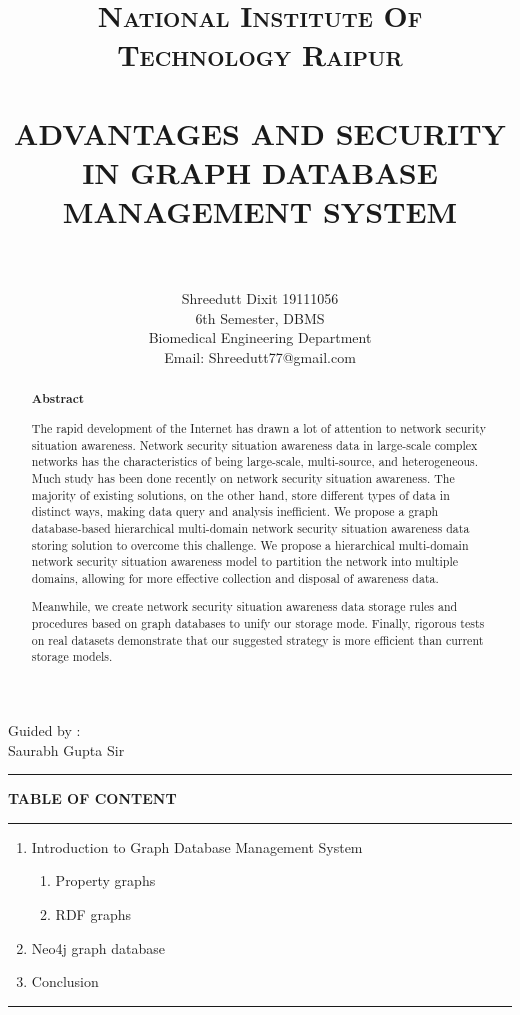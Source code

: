 \documentclass[paper=a4, fontsize=11pt]{scrartcl}
\title{
		\usefont{OT1}{bch}{b}{n}
		\normalfont \normalsize \textsc{National Institute Of Technology Raipur} \\ [25pt]
		\horrule{0.5pt} \\[0.4cm]
		\huge ADVANTAGES AND SECURITY IN GRAPH DATABASE MANAGEMENT SYSTEM  \\
		\horrule{2pt} \\[0.5cm]
}
\author{
        Shreedutt Dixit 19111056\\6th Semester, 
        DBMS\\ Biomedical Engineering Department\\	
        Email: Shreedutt77@gmail.com
        \normalsize
}
\date{}
\numberwithin{equation}{section}		%
\numberwithin{figure}{section}			%
\numberwithin{table}{section}				%
\begin{document}
\maketitle
\begin{flushright}
    Guided by :\\
    Saurabh Gupta Sir
\end{flushright}

\noindent\rule{\textwidth}{1pt}
\begin{abstract}
    \begin{center}
        \Large{\textbf{Abstract}}\\
    \end{center}
    \Large { The rapid development of the Internet has drawn a lot of attention to network security situation awareness. Network security situation awareness data in large-scale complex networks has the characteristics of being large-scale, multi-source, and heterogeneous. Much study has been done recently on network security situation awareness. The majority of existing solutions, on the other hand, store different types of data in distinct ways, making data query and analysis inefficient.
    \newpage 
    We propose a graph database-based hierarchical multi-domain network security situation awareness data storing solution to overcome this challenge. We propose a hierarchical multi-domain network security situation awareness model to partition the network into multiple domains, allowing for more effective collection and disposal of awareness data.
    
    Meanwhile, we create network security situation awareness data storage rules and procedures based on graph databases to unify our storage mode. Finally, rigorous tests on real datasets demonstrate that our suggested strategy is more efficient than current storage models.}
\end{abstract}


\newpage
\textbf{TABLE OF CONTENT}\\
\rule{\textwidth}{1pt}
\begin{enumerate}
    \item Introduction to Graph Database Management System
    \begin{enumerate}
        \item Property graphs
        \item RDF graphs
    \end{enumerate}
    \item Neo4j graph database
    \item Conclusion
\end{enumerate}
\rule{\textwidth}{1pt}
\newpage
\Large
\end{document}
